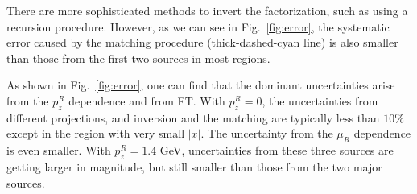 There are more sophisticated methods to invert the factorization, such as using a recursion procedure. However, as we can see in Fig.~\ref{fig:error}, the systematic error caused by the matching procedure (thick-dashed-cyan line) is also smaller than those from the first two sources in most regions.


 As shown in Fig.~\ref{fig:error}, one can find  that the dominant   uncertainties arise  from  the $p_z^R$ dependence and  from FT. With $p_z^R=0$, the uncertainties  from different  projections, and  inversion and the matching are typically  less than $10\%$ except in the region with very small $|x|$. The uncertainty  from the $\mu_R$ dependence is even smaller. With  $p_z^R=1.4$ GeV, uncertainties from these  three sources are getting  larger in magnitude, but still smaller than those from the two major sources. 

